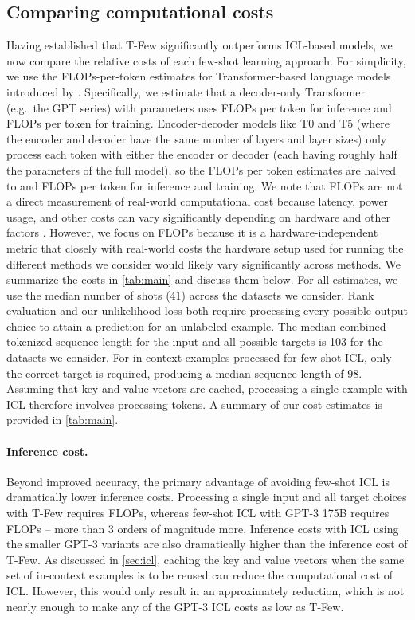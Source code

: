 \documentclass{article}
\newcommand{\tfew}{{\fontfamily{lmtt}\selectfont T-Few}\xspace}
\begin{document}
\subsection{Comparing computational costs}
\label{sec:costs}

Having established that \tfew significantly outperforms ICL-based models, we now compare the relative costs of each few-shot learning approach.
For simplicity, we use the FLOPs-per-token estimates for Transformer-based language models introduced by \citet{kaplan2020scaling}.
Specifically, we estimate that a decoder-only Transformer (e.g.\ the GPT series) with  parameters uses  FLOPs per token for inference and  FLOPs per token for training.
Encoder-decoder models like T0 and T5 (where the encoder and decoder have the same number of layers and layer sizes) only process each token with either the encoder or decoder (each having roughly half the parameters of the full model), so the FLOPs per token estimates are halved to  and  FLOPs per token for inference and training.
We note that FLOPs are not a direct measurement of real-world computational cost because latency, power usage, and other costs can vary significantly depending on hardware and other factors \cite{dehgani2021efficiency}.
However, we focus on FLOPs because it is a hardware-independent metric that closely with real-world costs the hardware setup used for running the different methods we consider would likely vary significantly across methods.
We summarize the costs in \cref{tab:main} and discuss them below.
For all estimates, we use the median number of shots (41) across the datasets we consider.
Rank evaluation and our unlikelihood loss both require processing every possible output choice to attain a prediction for an unlabeled example.
The median combined tokenized sequence length for the input and all possible targets is 103 for the datasets we consider.
For in-context examples processed for few-shot ICL, only the correct target is required, producing a median sequence length of 98.
Assuming that key and value vectors are cached, processing a single example with ICL therefore involves processing  tokens.
A summary of our cost estimates is provided in \cref{tab:main}.

\paragraph{Inference cost.}

Beyond improved accuracy, the primary advantage of avoiding few-shot ICL is dramatically lower inference costs.
Processing a single input and all target choices with \tfew requires  FLOPs, whereas few-shot ICL with GPT-3 175B requires  FLOPs -- more than 3 orders of magnitude more.
Inference costs with ICL using the smaller GPT-3 variants are also dramatically higher than the inference cost of \tfew.
As discussed in \cref{sec:icl}, caching the key and value vectors when the same set of in-context examples is to be reused can reduce the computational cost of ICL.
However, this would only result in an approximately  reduction, which is not nearly enough to make any of the GPT-3 ICL costs as low as \tfew.
\end{document}
